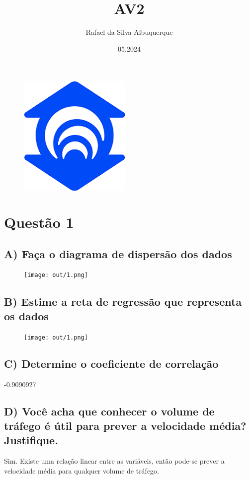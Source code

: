 \documentclass[17pt]{extarticle}
\title{AV2}
\author{Rafael da Silva Albuquerque}
\date{05.2024}
\begin{document}
\begin{figure}[t]
    \centering
    \includegraphics[width=0.5\linewidth]{doc/unifor-logo.png}
    \label{fig:my_label}
\end{figure}
\maketitle

\newpage
\section{Questão 1}
\subsection{A) Faça o diagrama de dispersão dos dados}
\begin{figure}[H]
    \centering
    \texttt{[image: out/1.png]}
    \label{fig:my_label}
\end{figure}

\subsection{B) Estime a reta de regressão que representa os dados}
\begin{figure}[H]
    \centering
    \texttt{[image: out/1.png]}
    \label{fig:my_label}
\end{figure}

\subsection{C) Determine o coeficiente de correlação}
-0.9090927

\subsection{D) Você acha que conhecer o volume de tráfego é útil para prever a velocidade média? Justifique.}
Sim. Existe uma relação linear entre as variáveis, então pode-se prever a velocidade média para qualquer volume de tráfego.
\end{document}
